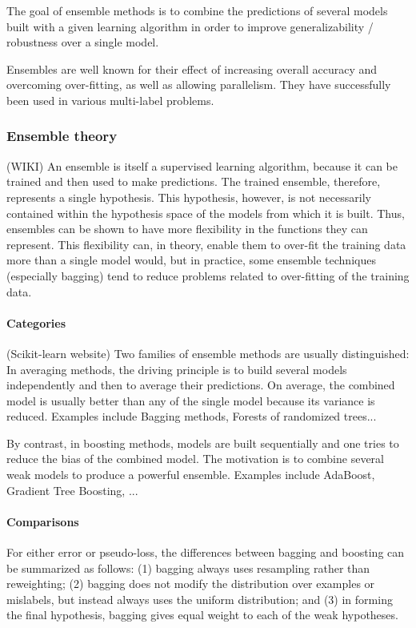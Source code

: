 The goal of ensemble methods is to combine the predictions of several models built with a given learning algorithm in order to improve generalizability / robustness over a single model.

Ensembles are well known for their effect of increasing overall accuracy and
overcoming over-ﬁtting, as well as allowing parallelism. They have successfully
been used in various multi-label problems.

\subsubsection{Ensemble theory}

(WIKI) An ensemble is itself a supervised learning algorithm, because it can be trained and then used to make predictions. The trained ensemble, therefore, represents a single hypothesis. This hypothesis, however, is not necessarily contained within the hypothesis space of the models from which it is built. Thus, ensembles can be shown to have more flexibility in the functions they can represent. This flexibility can, in theory, enable them to over-fit the training data more than a single model would, but in practice, some ensemble techniques (especially bagging) tend to reduce problems related to over-fitting of the training data.

\paragraph{Categories}

(Scikit-learn website) Two families of ensemble methods are usually distinguished:
In averaging methods, the driving principle is to build several models independently and then to average their predictions. On average, the combined model is usually better than any of the single model because its variance is reduced. Examples include Bagging methods, Forests of randomized trees...

By contrast, in boosting methods, models are built sequentially and one tries to reduce the bias of the combined model. The motivation is to combine several weak models to produce a powerful ensemble. Examples include AdaBoost, Gradient Tree Boosting, ...

\paragraph{Comparisons}
\cite{freund1996experiments} For either error or pseudo-loss, the differences between bagging and boosting can be summarized
as follows: (1) bagging always uses resampling rather than reweighting; (2) bagging does not
modify the distribution over examples or mislabels, but instead always uses the uniform distribution;
and (3) in forming the ﬁnal hypothesis, bagging gives equal weight to each of the weak hypotheses.

